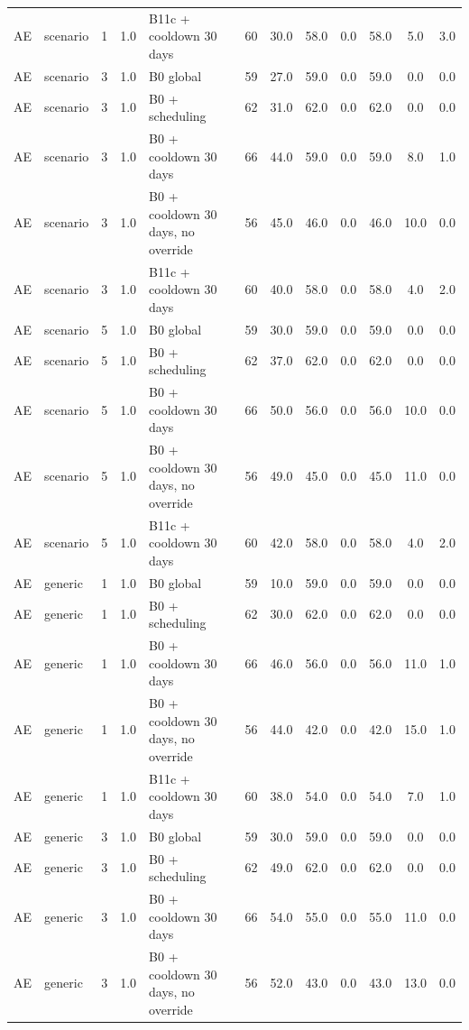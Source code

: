 \documentclass[10pt,onecolumn,letterpaper]{article}
\begin{document}
\begin{longtable}{lllllccccccc}
AE & scenario & 1 & 1.0 & B11c + cooldown 30 days & 60 & 30.0 & 58.0 & 0.0 & 58.0 & 5.0 & 3.0 \\
AE & scenario & 3 & 1.0 & B0 global & 59 & 27.0 & 59.0 & 0.0 & 59.0 & 0.0 & 0.0 \\
AE & scenario & 3 & 1.0 & B0 + scheduling & 62 & 31.0 & 62.0 & 0.0 & 62.0 & 0.0 & 0.0 \\
AE & scenario & 3 & 1.0 & B0 + cooldown 30 days & 66 & 44.0 & 59.0 & 0.0 & 59.0 & 8.0 & 1.0 \\
AE & scenario & 3 & 1.0 & B0 + cooldown 30 days, no override & 56 & 45.0 & 46.0 & 0.0 & 46.0 & 10.0 & 0.0 \\
AE & scenario & 3 & 1.0 & B11c + cooldown 30 days & 60 & 40.0 & 58.0 & 0.0 & 58.0 & 4.0 & 2.0 \\
AE & scenario & 5 & 1.0 & B0 global & 59 & 30.0 & 59.0 & 0.0 & 59.0 & 0.0 & 0.0 \\
AE & scenario & 5 & 1.0 & B0 + scheduling & 62 & 37.0 & 62.0 & 0.0 & 62.0 & 0.0 & 0.0 \\
AE & scenario & 5 & 1.0 & B0 + cooldown 30 days & 66 & 50.0 & 56.0 & 0.0 & 56.0 & 10.0 & 0.0 \\
AE & scenario & 5 & 1.0 & B0 + cooldown 30 days, no override & 56 & 49.0 & 45.0 & 0.0 & 45.0 & 11.0 & 0.0 \\
AE & scenario & 5 & 1.0 & B11c + cooldown 30 days & 60 & 42.0 & 58.0 & 0.0 & 58.0 & 4.0 & 2.0 \\
AE & generic & 1 & 1.0 & B0 global & 59 & 10.0 & 59.0 & 0.0 & 59.0 & 0.0 & 0.0 \\
AE & generic & 1 & 1.0 & B0 + scheduling & 62 & 30.0 & 62.0 & 0.0 & 62.0 & 0.0 & 0.0 \\
AE & generic & 1 & 1.0 & B0 + cooldown 30 days & 66 & 46.0 & 56.0 & 0.0 & 56.0 & 11.0 & 1.0 \\
AE & generic & 1 & 1.0 & B0 + cooldown 30 days, no override & 56 & 44.0 & 42.0 & 0.0 & 42.0 & 15.0 & 1.0 \\
AE & generic & 1 & 1.0 & B11c + cooldown 30 days & 60 & 38.0 & 54.0 & 0.0 & 54.0 & 7.0 & 1.0 \\
AE & generic & 3 & 1.0 & B0 global & 59 & 30.0 & 59.0 & 0.0 & 59.0 & 0.0 & 0.0 \\
AE & generic & 3 & 1.0 & B0 + scheduling & 62 & 49.0 & 62.0 & 0.0 & 62.0 & 0.0 & 0.0 \\
AE & generic & 3 & 1.0 & B0 + cooldown 30 days & 66 & 54.0 & 55.0 & 0.0 & 55.0 & 11.0 & 0.0 \\
AE & generic & 3 & 1.0 & B0 + cooldown 30 days, no override & 56 & 52.0 & 43.0 & 0.0 & 43.0 & 13.0 & 0.0 \\

\end{longtable}
\end{document}

